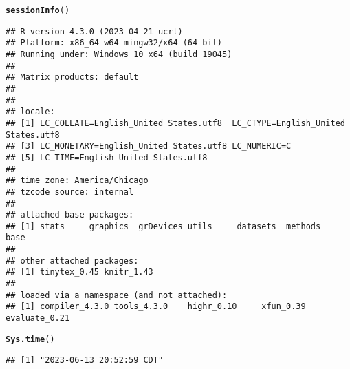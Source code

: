 \documentclass{article}\usepackage[]{graphicx}\usepackage[]{xcolor}
\makeatletter
\newcommand{\hlstd}[1]{\textcolor[rgb]{0.345,0.345,0.345}{#1}}%
\newcommand{\hlkwd}[1]{\textcolor[rgb]{0.737,0.353,0.396}{\textbf{#1}}}%
\newenvironment{kframe}{%
 \def\at@end@of@kframe{}%
 \ifinner\ifhmode%
  \def\at@end@of@kframe{\end{minipage}}%
  \begin{minipage}{\columnwidth}%
 \fi\fi%
 \def\FrameCommand##1{\hskip\@totalleftmargin \hskip-\fboxsep
 \colorbox{shadecolor}{##1}\hskip-\fboxsep
     \hskip-\linewidth \hskip-\@totalleftmargin \hskip\columnwidth}%
 \MakeFramed {\advance\hsize-\width
   \@totalleftmargin\z@ \linewidth\hsize
   \@setminipage}}%
 {\par\unskip\endMakeFramed%
 \at@end@of@kframe}
\newenvironment{knitrout}{}{} %
\makeatother
\begin{document}
\begin{knitrout}
\color{fgcolor}\begin{kframe}
\begin{alltt}
\hlkwd{sessionInfo}\hlstd{()}
\end{alltt}
\begin{verbatim}
## R version 4.3.0 (2023-04-21 ucrt)
## Platform: x86_64-w64-mingw32/x64 (64-bit)
## Running under: Windows 10 x64 (build 19045)
## 
## Matrix products: default
## 
## 
## locale:
## [1] LC_COLLATE=English_United States.utf8  LC_CTYPE=English_United States.utf8   
## [3] LC_MONETARY=English_United States.utf8 LC_NUMERIC=C                          
## [5] LC_TIME=English_United States.utf8    
## 
## time zone: America/Chicago
## tzcode source: internal
## 
## attached base packages:
## [1] stats     graphics  grDevices utils     datasets  methods   base     
## 
## other attached packages:
## [1] tinytex_0.45 knitr_1.43  
## 
## loaded via a namespace (and not attached):
## [1] compiler_4.3.0 tools_4.3.0    highr_0.10     xfun_0.39      evaluate_0.21
\end{verbatim}
\begin{alltt}
\hlkwd{Sys.time}\hlstd{()}
\end{alltt}
\begin{verbatim}
## [1] "2023-06-13 20:52:59 CDT"
\end{verbatim}
\end{kframe}
\end{knitrout}
\end{document}
